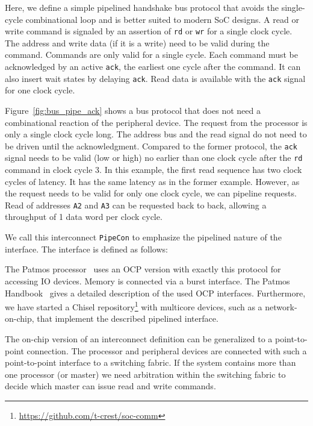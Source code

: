 \documentclass[%
    10pt,
    headinclude, footexclude,
    openright, %
    notitlepage,
    cleardoubleempty,
    headsepline,
    pointlessnumbers,
    bibtotoc, idxtotoc,
    ]{scrbook}
\newcommand{\code}[1]{{\lstinline[basicstyle=\small\ttfamily]{#1}}}
\newcommand{\todo}[1]{{\emph{TODO: #1}}}
\newcommand{\myref}[2]{\href{#1}{#2}}
\renewcommand{\myref}[2]{{#2}{\footnote{\url{#1}}}}
\renewcommand{\todo}[1]{}
\begin{document}
\todo{Don't formulate it just relative to the other. Formulate it as its own thing.
Maybe then compare. This needs some better writing, also put it into the soc-comm README.
Also have a write timing diagram. And find a better font for the diagram to have nicer
rendering in the SVG.}

Here, we define a simple pipelined handshake bus protocol that avoids the single-cycle combinational loop and is better suited to modern SoC designs.
 A read or write command is signaled by an assertion of \code{rd} or \code{wr}
 for a single clock cycle.
The address and write data (if it is a write) need to be valid during
the command. Commands are only valid for a single cycle.
Each command must be acknowledged by an active \code{ack},
the earliest one cycle after the command. It can also insert wait
states by delaying \code{ack}. Read data is available with the \code{ack}
signal for one clock cycle.

Figure~\ref{fig:bus_pipe_ack} shows a bus protocol that does not need
a combinational reaction of the peripheral device. The request from the processor
is only a single clock cycle long. The address bus and the read signal do not need to be driven
until the acknowledgment. Compared to the former protocol, the \code{ack} signal needs to
be valid (low or high)
no earlier than one clock cycle after the \code{rd} command in clock cycle 3.
In this example, the first read sequence has two clock cycles of latency.
It has the same latency as in the former example.
However, as the request needs to be valid for only one clock cycle, we can pipeline
requests. Read of addresses \code{A2} and \code{A3} can be requested back to back,
allowing a throughput of 1 data word per clock cycle.

We call this interconnect \code{PipeCon} to emphasize the pipelined nature of
the interface. The interface is defined as follows:


The Patmos processor~\cite{patmos:rts2018} uses an OCP version with exactly this
protocol for accessing IO devices. Memory is connected via a burst interface.
The Patmos Handbook~\cite{patmos:handbook} gives a detailed description of the
used OCP interfaces.
Furthermore, we have started a
\myref{https://github.com/t-crest/soc-comm}{Chisel repository} with multicore devices, such as
a network-on-chip, that implement the described pipelined interface.

The on-chip version of an interconnect definition can be generalized to a point-to-point
connection. The processor and peripheral devices are connected with such a point-to-point
interface to a switching fabric. If the system contains more than one processor (or master)
we need arbitration within the switching fabric to decide which master can issue
read and write commands.
\end{document}
